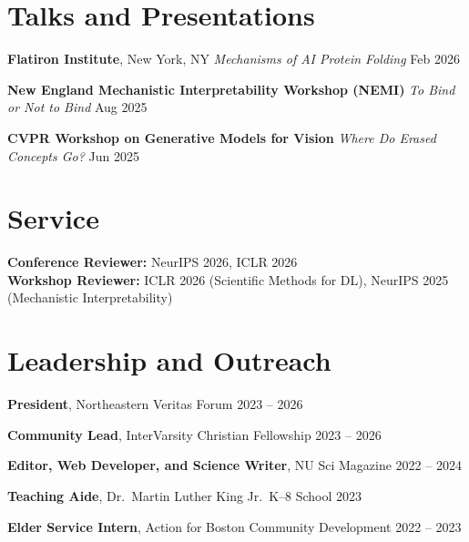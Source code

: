 \documentclass[11pt,letterpaper]{article}
\newcommand{\oneline}[2]{#1 \hfill #2\par}
\begin{document}
\section{Talks and Presentations}
\oneline{\textbf{Flatiron Institute}, New York, NY \quad \textit{Mechanisms of AI Protein Folding}}{Feb 2026}
\oneline{\textbf{New England Mechanistic Interpretability Workshop (NEMI)} \quad \textit{To Bind or Not to Bind}}{Aug 2025}
\oneline{\textbf{CVPR Workshop on Generative Models for Vision} \quad \textit{Where Do Erased Concepts Go?}}{Jun 2025}

\section{Service}
\textbf{Conference Reviewer:} NeurIPS 2026, ICLR 2026 \\
\textbf{Workshop Reviewer:} ICLR 2026 (Scientific Methods for DL), NeurIPS 2025 (Mechanistic Interpretability)

\section{Leadership and Outreach}
\oneline{\textbf{President}, Northeastern Veritas Forum}{2023 -- 2026}
\oneline{\textbf{Community Lead}, InterVarsity Christian Fellowship}{2023 -- 2026}
\oneline{\textbf{Editor, Web Developer, and Science Writer}, NU Sci Magazine}{2022 -- 2024}
\oneline{\textbf{Teaching Aide}, Dr.\ Martin Luther King Jr.\ K--8 School}{2023}
\oneline{\textbf{Elder Service Intern}, Action for Boston Community Development}{2022 -- 2023}
\end{document}
